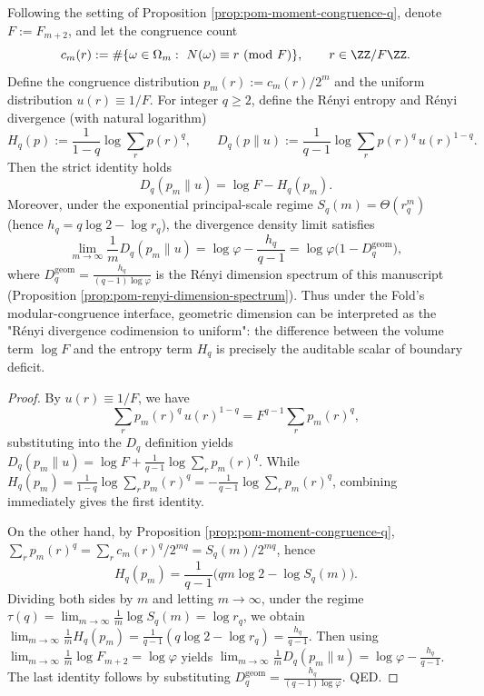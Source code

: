 
\begin{corollary}\label{cor:pom-mod-congruence-renyi-divergence-codim}
Following the setting of Proposition \ref{prop:pom-moment-congruence-q}, denote \(F:=F_{m+2}\), and let the congruence count
\[
c_m(r):=\#\{\omega\in\Omega_m:\ N(\omega)\equiv r\ (\mathrm{mod}\ F)\},
\qquad r\in\ZZ/F\ZZ.
\]
Define the congruence distribution \(p_m(r):=c_m(r)/2^m\) and the uniform distribution \(u(r)\equiv 1/F\).
For integer \(q\ge 2\), define the R\'enyi entropy and R\'enyi divergence (with natural logarithm)
\[
H_q(p):=\frac{1}{1-q}\log\sum_{r}p(r)^q,
\qquad
D_q(p\|u):=\frac{1}{q-1}\log\sum_{r}p(r)^q\,u(r)^{1-q}.
\]
Then the strict identity holds
\[
\boxed{\;
D_q(p_m\|u)=\log F-H_q(p_m).\;}
\]
Moreover, under the exponential principal-scale regime \(S_q(m)=\Theta(r_q^m)\) (hence \(h_q=q\log 2-\log r_q\)), the divergence density limit satisfies
\[
\boxed{\;
\lim_{m\to\infty}\frac{1}{m}D_q(p_m\|u)
=\log\varphi-\frac{h_q}{q-1}
=\log\varphi\bigl(1-D_q^{\mathrm{geom}}\bigr),\;}
\]
where \(D_q^{\mathrm{geom}}=\frac{h_q}{(q-1)\log\varphi}\) is the R\'enyi dimension spectrum of this manuscript (Proposition \ref{prop:pom-renyi-dimension-spectrum}).
Thus under the Fold's modular-congruence interface, geometric dimension can be interpreted as the "R\'enyi divergence codimension to uniform": the difference between the volume term \(\log F\) and the entropy term \(H_q\) is precisely the auditable scalar of boundary deficit.
\end{corollary}
\begin{proof}
By \(u(r)\equiv 1/F\), we have
\[
\sum_r p_m(r)^q\,u(r)^{1-q}=F^{q-1}\sum_r p_m(r)^q,
\]
substituting into the \(D_q\) definition yields
\(
D_q(p_m\|u)=\log F+\frac{1}{q-1}\log\sum_r p_m(r)^q
\).
While
\(
H_q(p_m)=\frac{1}{1-q}\log\sum_r p_m(r)^q
=-\frac{1}{q-1}\log\sum_r p_m(r)^q
\),
combining immediately gives the first identity.
\par
On the other hand, by Proposition \ref{prop:pom-moment-congruence-q},
\(
\sum_r p_m(r)^q=\sum_r c_m(r)^q/2^{mq}=S_q(m)/2^{mq}
\),
hence
\[
H_q(p_m)=\frac{1}{q-1}\bigl(qm\log 2-\log S_q(m)\bigr).
\]
Dividing both sides by \(m\) and letting \(m\to\infty\), under the regime \(\tau(q)=\lim_{m\to\infty}\frac{1}{m}\log S_q(m)=\log r_q\), we obtain
\(
\lim_{m\to\infty}\frac{1}{m}H_q(p_m)=\frac{1}{q-1}(q\log 2-\log r_q)=\frac{h_q}{q-1}
\).
Then using \(\lim_{m\to\infty}\frac{1}{m}\log F_{m+2}=\log\varphi\) yields
\(
\lim_{m\to\infty}\frac{1}{m}D_q(p_m\|u)=\log\varphi-\frac{h_q}{q-1}
\).
The last identity follows by substituting \(D_q^{\mathrm{geom}}=\frac{h_q}{(q-1)\log\varphi}\). QED.
\end{proof}


